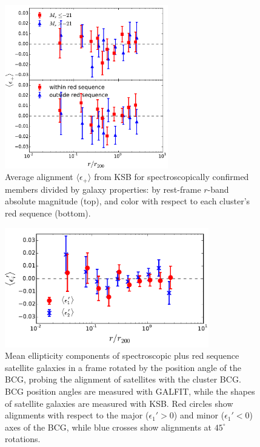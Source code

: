 \begin{figure}
\begin{minipage}[b]{2.8in}
 \centerline{\includegraphics[width=2.8in]{chapter4/shear-spec-galsub-rnorm-logbins.pdf}}
\end{minipage}
\begin{minipage}[b]{2in}
\caption{\small Average alignment $\langle \epsilon_+ \rangle$ from KSB for spectroscopically 
confirmed members divided by galaxy properties: by rest-frame $r$-band absolute magnitude 
(top), and color with respect to each cluster's red sequence (bottom).}
\label{f:shear-galsub}
\end{minipage}
\end{figure}

\begin{figure}
 \centerline{\includegraphics[width=3.5in]{chapter4/bcg-alignment.pdf}}
\caption{\small Mean ellipticity components of spectroscopic plus red sequence satellite galaxies 
in a frame rotated by the position angle of the BCG, probing the alignment of satellites with the 
cluster BCG. BCG position angles are measured with GALFIT, while the shapes of satellite galaxies 
are measured with KSB. Red circles show alignments with respect to the major ($\epsilon_1'>0$) and 
minor ($\epsilon_1'<0$) axes of the BCG, while blue crosses show alignments at $45^\circ$ 
rotations.}
\label{f:bcg}
\end{figure}


